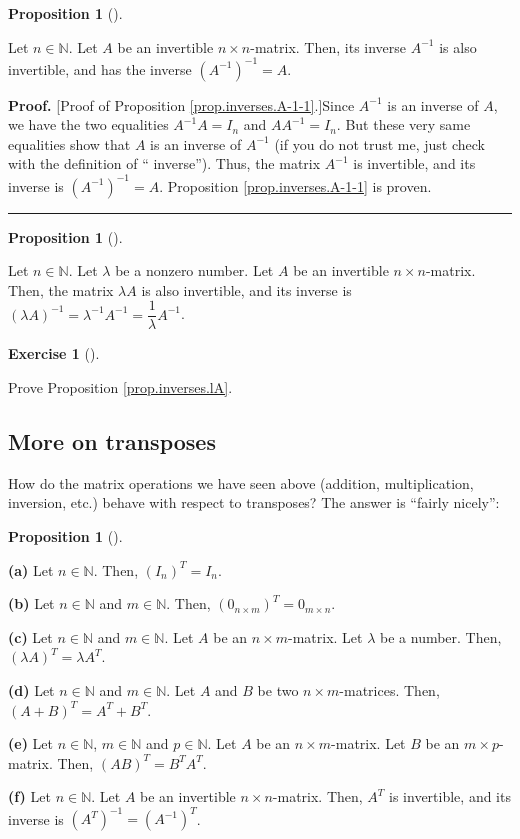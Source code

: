 \documentclass[numbers=enddot,12pt,final,onecolumn,notitlepage]{scrartcl}%
\theoremstyle{definition}
\newtheorem{prop}[theo]{Proposition}
\newenvironment{proposition}[1][]
{\begin{prop}[#1]\begin{leftbar}}
{\end{leftbar}\end{prop}}
\newtheorem{exmp}[theo]{Exercise}
\newenvironment{exercise}[1][]
{\begin{exmp}[#1]\begin{leftbar}}
{\end{leftbar}\end{exmp}}
\newenvironment{proof}[1][Proof]{\noindent\textbf{#1.} }{\ \rule{0.5em}{0.5em}}
\begin{document}
\begin{proposition}
\label{prop.inverses.A-1-1}Let $n\in\mathbb{N}$. Let $A$ be an invertible
$n\times n$-matrix. Then, its inverse $A^{-1}$ is also invertible, and has the
inverse $\left(  A^{-1}\right)  ^{-1}=A$.
\end{proposition}

\begin{proof}
[Proof of Proposition \ref{prop.inverses.A-1-1}.]Since $A^{-1}$ is an inverse
of $A$, we have the two equalities $A^{-1}A=I_{n}$ and $AA^{-1}=I_{n}$. But
these very same equalities show that $A$ is an inverse of $A^{-1}$ (if you do
not trust me, just check with the definition of \textquotedblleft
inverse\textquotedblright). Thus, the matrix $A^{-1}$ is invertible, and its
inverse is $\left(  A^{-1}\right)  ^{-1}=A$. Proposition
\ref{prop.inverses.A-1-1} is proven.
\end{proof}

\begin{proposition}
\label{prop.inverses.lA}Let $n\in\mathbb{N}$. Let $\lambda$ be a nonzero
number. Let $A$ be an invertible $n\times n$-matrix. Then, the matrix $\lambda
A$ is also invertible, and its inverse is $\left(  \lambda A\right)
^{-1}=\lambda^{-1}A^{-1}=\dfrac{1}{\lambda}A^{-1}$.
\end{proposition}

\begin{exercise}
\label{exe.prop.inverses.lA}Prove Proposition \ref{prop.inverses.lA}.
\end{exercise}

\subsection{More on transposes}

How do the matrix operations we have seen above (addition, multiplication,
inversion, etc.) behave with respect to transposes? The answer is
\textquotedblleft fairly nicely\textquotedblright:

\begin{proposition}
\label{prop.transpose.opers}\textbf{(a)} Let $n\in\mathbb{N}$. Then, $\left(
I_{n}\right)  ^{T}=I_{n}$.

\textbf{(b)} Let $n\in\mathbb{N}$ and $m\in\mathbb{N}$. Then, $\left(
0_{n\times m}\right)  ^{T}=0_{m\times n}$.

\textbf{(c)} Let $n\in\mathbb{N}$ and $m\in\mathbb{N}$. Let $A$ be an $n\times
m$-matrix. Let $\lambda$ be a number. Then, $\left(  \lambda A\right)
^{T}=\lambda A^{T}$.

\textbf{(d)} Let $n\in\mathbb{N}$ and $m\in\mathbb{N}$. Let $A$ and $B$ be two
$n\times m$-matrices. Then, $\left(  A+B\right)  ^{T}=A^{T}+B^{T}$.

\textbf{(e)} Let $n\in\mathbb{N}$, $m\in\mathbb{N}$ and $p\in\mathbb{N}$. Let
$A$ be an $n\times m$-matrix. Let $B$ be an $m\times p$-matrix. Then, $\left(
AB\right)  ^{T}=B^{T}A^{T}$.

\textbf{(f)} Let $n\in\mathbb{N}$. Let $A$ be an invertible $n\times
n$-matrix. Then, $A^{T}$ is invertible, and its inverse is $\left(
A^{T}\right)  ^{-1}=\left(  A^{-1}\right)  ^{T}$.
\end{proposition}
\end{document}
